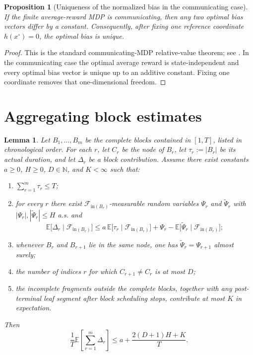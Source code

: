 \documentclass[12pt]{article}
\newtheorem{proposition}[theorem]{Proposition}
\newtheorem{lemma}[theorem]{Lemma}
\theoremstyle{definition}
\newcommand{\N}{\mathbb{N}}
\newcommand{\E}{\mathbb{E}}
\newcommand{\1}{\mathbf{1}}
\newcommand{\cF}{\mathcal{F}}
\begin{document}
\begin{proposition}[Uniqueness of the normalized bias in the communicating case]
\label{prop:bias-unique}
If the finite average-reward MDP is communicating, then any two optimal bias
vectors differ by a constant. Consequently, after fixing one reference coordinate
$h(x^\circ)=0$, the optimal bias is unique.
\end{proposition}

\begin{proof}
This is the standard communicating-MDP relative-value theorem; see
\cite[Chapter~8]{Puterman1994}. In the communicating case the optimal average
reward is state-independent and every optimal bias vector is unique up to an
additive constant. Fixing one coordinate removes that one-dimensional freedom.
\end{proof}


\section{Aggregating block estimates}
\label{app:aggregation}

\begin{lemma}
\label{lem:aggregation}
Let $B_1,\dots,B_m$ be the complete blocks contained in $[1,T]$, listed in
chronological order. For each $r$, let $C_r$ be the node of $B_r$, let
$\tau_r:=|B_r|$ be its actual duration, and let $\Delta_r$ be a block contribution.
Assume there exist constants $a\ge 0$, $H\ge 0$, $D\in\N$, and $K<\infty$ such that:
\begin{enumerate}[label=\textnormal{(\roman*)},leftmargin=2.6em]
\item $\sum_{r=1}^m \tau_r\le T$;
\item for every $r$ there exist $\cF_{\mathrm{in}(B_r)}$-measurable random variables
$\Psi_r$ and $\widetilde\Psi_r$ with $|\Psi_r|,|\widetilde\Psi_r|\le H$ a.s. and
\[
\E\bigl[\Delta_r\mid \cF_{\mathrm{in}(B_r)}\bigr]
\le
a\,\E\bigl[\tau_r\mid \cF_{\mathrm{in}(B_r)}\bigr]
+
\Psi_r-\E\bigl[\widetilde\Psi_r\mid \cF_{\mathrm{in}(B_r)}\bigr];
\]
\item whenever $B_r$ and $B_{r+1}$ lie in the same node, one has
$\widetilde\Psi_r=\Psi_{r+1}$ almost surely;
\item the number of indices $r$ for which $C_{r+1}\neq C_r$ is at most $D$;
\item the incomplete fragments outside the complete blocks, together with any
post-terminal leaf segment after block scheduling stops, contribute at most $K$
in expectation.
\end{enumerate}
Then
\[
\frac1T\E\left[\sum_{r=1}^m \Delta_r\right]
\le a + \frac{2(D+1)H+K}{T}.
\]
\end{lemma}
\end{document}
